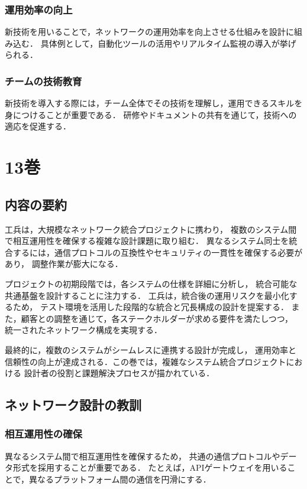 \documentclass[titlepage,a4paper]{jsarticle}
\begin{document}
\subsubsection{運用効率の向上}
新技術を用いることで，ネットワークの運用効率を向上させる仕組みを設計に組み込む．
具体例として，自動化ツールの活用やリアルタイム監視の導入が挙げられる．

\subsubsection{チームの技術教育}
新技術を導入する際には，チーム全体でその技術を理解し，運用できるスキルを身につけることが重要である．
研修やドキュメントの共有を通じて，技術への適応を促進する．

\newpage
\section{13巻}
\subsection{内容の要約}
工兵は，大規模なネットワーク統合プロジェクトに携わり，
複数のシステム間で相互運用性を確保する複雑な設計課題に取り組む．
異なるシステム同士を統合するには，通信プロトコルの互換性やセキュリティの一貫性を確保する必要があり，
調整作業が膨大になる．

プロジェクトの初期段階では，各システムの仕様を詳細に分析し，
統合可能な共通基盤を設計することに注力する．
工兵は，統合後の運用リスクを最小化するため，
テスト環境を活用した段階的な統合と冗長構成の設計を提案する．
また，顧客との調整を通じて，各ステークホルダーが求める要件を満たしつつ，
統一されたネットワーク構成を実現する．

最終的に，複数のシステムがシームレスに連携する設計が完成し，
運用効率と信頼性の向上が達成される．この巻では，複雑なシステム統合プロジェクトにおける
設計者の役割と課題解決プロセスが描かれている．

\subsection{ネットワーク設計の教訓}
\subsubsection{相互運用性の確保}
異なるシステム間で相互運用性を確保するため，
共通の通信プロトコルやデータ形式を採用することが重要である．
たとえば，APIゲートウェイを用いることで，異なるプラットフォーム間の通信を円滑にする．
\end{document}
